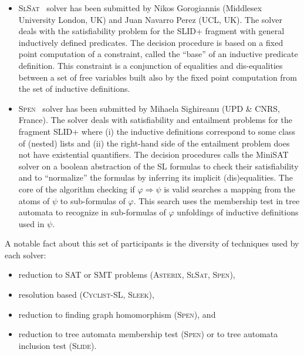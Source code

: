 \documentclass[twoside,11pt]{article}
\newcommand{\limp}{\Rightarrow}
\newcommand{\SLRD}{\textsc{SLID}}
\newcommand{\ASTERIX}{\textsc{Asterix}}
\newcommand{\CYCLIST}{\textsc{Cyclist-SL}}
\newcommand{\SLEEK}{\textsc{Sleek}}
\newcommand{\SLIDE}{\textsc{Slide}}
\newcommand{\SLSAT}{\textsc{SlSat}}
\newcommand{\SPEN}{\textsc{Spen}}
\begin{document}
\begin{itemize}
\item \SLSAT~\cite{BrotherstonFPG14} 
solver has been submitted by 
Nikos Gorogiannis (Middlesex University London, UK) 
and  Juan Navarro Perez (UCL, UK).
The solver deals with the satisfiability problem for the \SLRD+ fragment with general inductively defined predicates.
The decision procedure is based on a fixed point computation of a constraint, called the ``base'' of an inductive predicate definition. This constraint is a conjunction of equalities and dis-equalities between a set of free variables built also by the fixed point computation from the set of inductive definitions.



\item \SPEN~\cite{EneaLSV14,SPENsite} 
solver has been submitted by 
Mihaela Sighireanu (UPD \& CNRS, France).
The solver deals with satisfiability and entailment problems for the fragment \SLRD+ where 
(i) the inductive definitions correspond to some class of (nested) lists
and (ii) the right-hand side of the entailment problem does not have existential quantifiers.
The decision procedures calls the MiniSAT solver on a boolean abstraction of the SL formulas to check their satisfiability and to ``normalize'' the formulas by inferring its implicit (dis)equalities. %
The core of the algorithm checking if $\varphi\limp\psi$ is valid searches a mapping from the atoms of $\psi$ to sub-formulas of $\varphi$.
This search uses the membership test in tree automata to recognize in sub-formulas of $\varphi$ unfoldings of inductive definitions used in $\psi$.

\end{itemize}

A notable fact about this set of participants is the diversity of techniques used by each solver:
\begin{itemize}
\item reduction to SAT or SMT problems (\ASTERIX, \SLSAT, \SPEN),
\item resolution based (\CYCLIST, \SLEEK),
\item reduction to finding graph homomorphism (\SPEN), and
\item reduction to tree automata membership test (\SPEN) or to tree automata inclusion test (\SLIDE).
\end{itemize}
\end{document}
